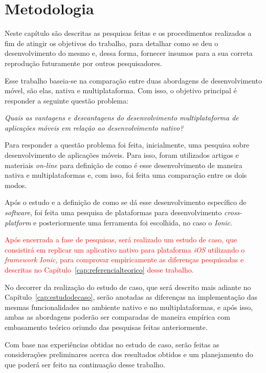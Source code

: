 \chapter{Metodologia} \label{cap:metodologia}
Neste capítulo são descritas as pesquisas feitas e os procedimentos realizados a 
fim de atingir os objetivos do trabalho, para detalhar como se deu o desenvolvimento do mesmo e, 
dessa forma, fornecer insumos para a sua correta reprodução futuramente por outros pesquisadores.

Esse trabalho baseia-se na comparação entre duas abordagens de desenvolvimento móvel, são elas, nativa e multiplataforma. 
Com isso, o objetivo principal é responder a seguinte questão problema:
\begin{center}
    \textit{Quais as vantagens e desvantagens do desenvolvimento multiplataforma de aplicações móveis em relação ao desenvolvimento nativo?}
\end{center}
Para responder a questão problema foi feita, inicialmente, uma pesquisa sobre desenvolvimento de aplicações móveis. 
Para isso, foram utilizados artigos e materiais \textit{on-line} para definição de como é esse desenvolvimento
de maneira nativa e multiplataformas e, com isso, foi feita uma comparação entre os dois modos. 

Após o estudo e a definição de como se dá esse desenvolvimento específico de \textit{software},
foi feita uma pesquisa de plataformas para desenvolvimento \textit{cross-platform} e posteriormente uma ferramenta foi escolhida, no caso o \textit{Ionic}. 

\textcolor{red}{Após encerrada a fase de pesquisas, será realizado um estudo de caso, que consistirá em replicar um aplicativo nativo para plataforma \textit{iOS} utilizando o \textit{framework Ionic}, 
para comprovar empiricamente as diferenças pesquisadas e descritas no Capítulo~\ref{cap:referencialteorico} desse trabalho.}

No decorrer da realização do estudo de caso, que será descrito mais adiante no 
Capítulo~\ref{cap:estudodecaso}, serão anotadas as diferenças na implementação das mesmas funcionalidades no ambiente nativo e no multiplataformas, e após isso, ambas as abordagens poderão ser comparadas
de maneira empírica com embasamento teórico oriundo das pesquisas feitas anteriormente.

Com base nas experiências obtidas no estudo de caso, serão feitas as considerações preliminares acerca dos resultados obtidos e um planejamento do que poderá ser feito na continuação desse trabalho.

